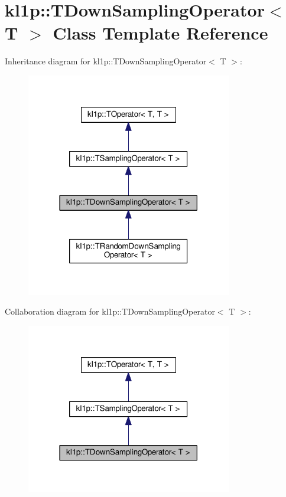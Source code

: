 \hypertarget{classkl1p_1_1TDownSamplingOperator}{}\section{kl1p\+:\+:T\+Down\+Sampling\+Operator$<$ T $>$ Class Template Reference}
\label{classkl1p_1_1TDownSamplingOperator}


Inheritance diagram for kl1p\+:\+:T\+Down\+Sampling\+Operator$<$ T $>$\+:
\nopagebreak
\begin{figure}[H]
\begin{center}
\leavevmode
\includegraphics[width=254pt]{classkl1p_1_1TDownSamplingOperator__inherit__graph}
\end{center}
\end{figure}


Collaboration diagram for kl1p\+:\+:T\+Down\+Sampling\+Operator$<$ T $>$\+:
\nopagebreak
\begin{figure}[H]
\begin{center}
\leavevmode
\includegraphics[width=254pt]{classkl1p_1_1TDownSamplingOperator__coll__graph}
\end{center}
\end{figure}
